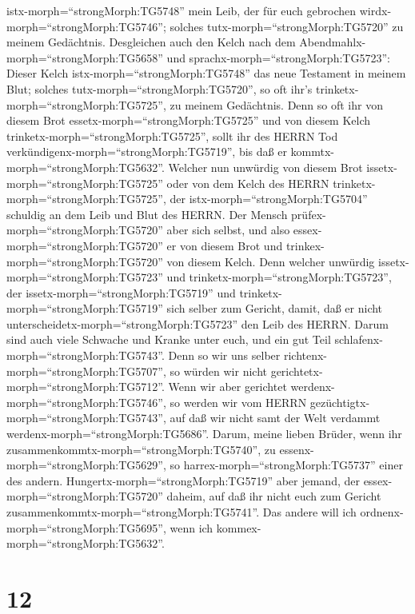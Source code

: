 istx-morph=``strongMorph:TG5748'' mein Leib, der für euch gebrochen
wirdx-morph=``strongMorph:TG5746''; solches
tutx-morph=``strongMorph:TG5720'' zu meinem Gedächtnis. 
Desgleichen auch den Kelch nach dem
Abendmahlx-morph=``strongMorph:TG5658'' und
sprachx-morph=``strongMorph:TG5723'': Dieser Kelch
istx-morph=``strongMorph:TG5748'' das neue Testament in meinem Blut;
solches tutx-morph=``strongMorph:TG5720'', so oft ihr's
trinketx-morph=``strongMorph:TG5725'', zu meinem Gedächtnis.
 Denn so oft ihr von diesem Brot
essetx-morph=``strongMorph:TG5725'' und von diesem Kelch
trinketx-morph=``strongMorph:TG5725'', sollt ihr des HERRN Tod
verkündigenx-morph=``strongMorph:TG5719'', bis daß er
kommtx-morph=``strongMorph:TG5632''.  Welcher nun unwürdig
von diesem Brot issetx-morph=``strongMorph:TG5725'' oder von dem Kelch
des HERRN trinketx-morph=``strongMorph:TG5725'', der
istx-morph=``strongMorph:TG5704'' schuldig an dem Leib und Blut des
HERRN.  Der Mensch prüfex-morph=``strongMorph:TG5720'' aber
sich selbst, und also essex-morph=``strongMorph:TG5720'' er von diesem
Brot und trinkex-morph=``strongMorph:TG5720'' von diesem Kelch.
 Denn welcher unwürdig issetx-morph=``strongMorph:TG5723''
und trinketx-morph=``strongMorph:TG5723'', der
issetx-morph=``strongMorph:TG5719'' und
trinketx-morph=``strongMorph:TG5719'' sich selber zum Gericht, damit,
daß er nicht unterscheidetx-morph=``strongMorph:TG5723'' den Leib des
HERRN.  Darum sind auch viele Schwache und Kranke unter
euch, und ein gut Teil schlafenx-morph=``strongMorph:TG5743''.
 Denn so wir uns selber
richtenx-morph=``strongMorph:TG5707'', so würden wir nicht
gerichtetx-morph=``strongMorph:TG5712''.  Wenn wir aber
gerichtet werdenx-morph=``strongMorph:TG5746'', so werden wir vom HERRN
gezüchtigtx-morph=``strongMorph:TG5743'', auf daß wir nicht samt der
Welt verdammt werdenx-morph=``strongMorph:TG5686''.  Darum,
meine lieben Brüder, wenn ihr
zusammenkommtx-morph=``strongMorph:TG5740'', zu
essenx-morph=``strongMorph:TG5629'', so
harrex-morph=``strongMorph:TG5737'' einer des andern. 
Hungertx-morph=``strongMorph:TG5719'' aber jemand, der
essex-morph=``strongMorph:TG5720'' daheim, auf daß ihr nicht euch zum
Gericht zusammenkommtx-morph=``strongMorph:TG5741''. Das andere will ich
ordnenx-morph=``strongMorph:TG5695'', wenn ich
kommex-morph=``strongMorph:TG5632''.

\hypertarget{section-11}{%
\section{12}\label{section-11}}

